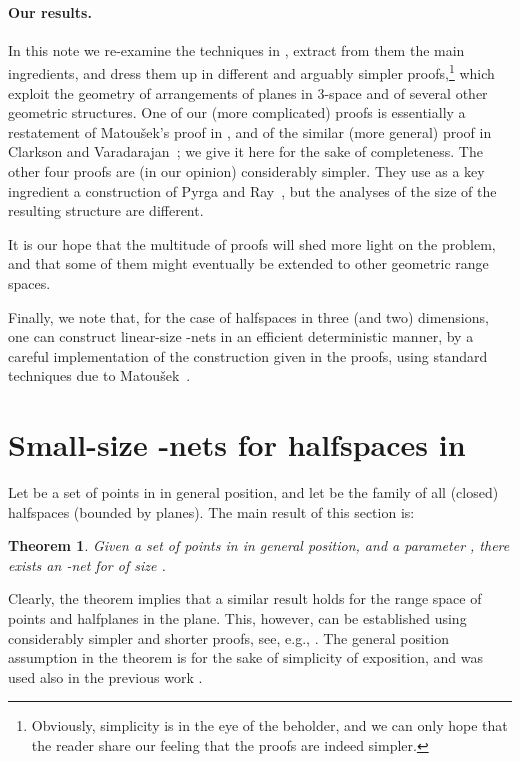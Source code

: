 \documentclass[12pt]{article}
\newtheorem{theorem}{Theorem}[section]
\providecommand{\Matousek}{Matou{\v s}ek\xspace}
\begin{document}
\paragraph{Our results.}
In this note we re-examine the techniques in 
\cite{ cv-iaags-07, m-rph-92, pr-nepen-08}, extract from them the main 
ingredients, and dress them up in different and arguably simpler proofs,\footnote{Obviously, simplicity is in the eye of the beholder, and we can
   only hope that the reader share our feeling that the proofs are
   indeed simpler.}  
which exploit the geometry of arrangements of planes in 3-space 
and of several other geometric structures. One of
our (more complicated) proofs is essentially a restatement of
\Matousek's proof in \cite{m-rph-92}, and of the similar (more
general) proof in Clarkson and Varadarajan~\cite{cv-iaags-07}; 
we give it here for the sake of
completeness. The other four proofs are (in our opinion) considerably
simpler. They use as a key ingredient a construction of Pyrga and
Ray~\cite{pr-nepen-08}, but the analyses of the size of the resulting
structure are different.

It is our hope that the multitude
of proofs will shed more light on the problem, and that some of them
might eventually be extended to other geometric range spaces.



Finally, we note that, for the case of halfspaces in three (and two)
dimensions, one can construct linear-size -nets in an efficient
deterministic manner, by a careful implementation of the construction
given in the proofs, using standard techniques due to
\Matousek~\cite{m-dcg-96}.



\section{Small-size -nets for halfspaces in }

Let  be a set of  points in  in general position, and
let  be the family of all (closed) halfspaces (bounded by
planes).  The main result of this section is:
\begin{theorem}\label{main3d}Given a set  of  points in  in general position,
    and a parameter , there exists an -net for
     of size .
\end{theorem}


Clearly, the theorem implies that a similar result holds for the range
space of points and halfplanes in the plane. This, however, can be
established using considerably simpler and shorter proofs, see, e.g.,
\cite{sy-pchp-12, w-enh-89}. The general position assumption in
the theorem is for the sake of simplicity of exposition, and was used
also in the previous work \cite{msw-hnlls-90}.
\end{document}
